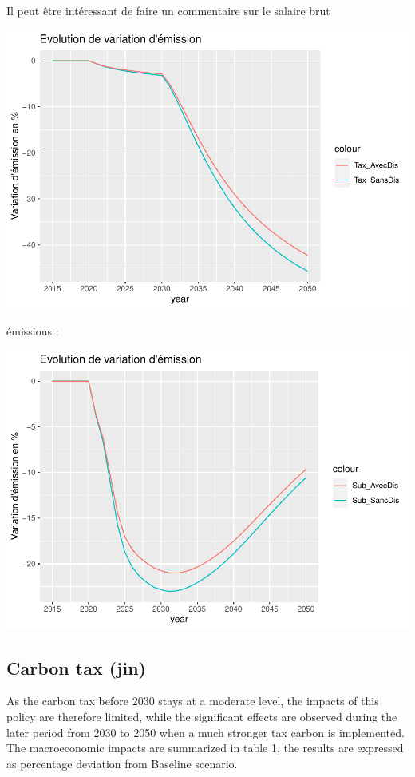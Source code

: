 \documentclass[
]{article}
\begin{document}
Il peut être intéressant de faire un commentaire sur le salaire brut

\includegraphics{Modele-ThreeMe-Tunisie_Sequeira_Valilou_Wang_files/figure-latex/unnamed-chunk-13-1.pdf}

émissions :

\includegraphics{Modele-ThreeMe-Tunisie_Sequeira_Valilou_Wang_files/figure-latex/unnamed-chunk-14-1.pdf}

\hypertarget{carbon-tax-jin-1}{%
\subsection{Carbon tax (jin)}\label{carbon-tax-jin-1}}

As the carbon tax before 2030 stays at a moderate level, the impacts of
this policy are therefore limited, while the significant effects are
observed during the later period from 2030 to 2050 when a much stronger
tax carbon is implemented. The macroeconomic impacts are summarized in
table 1, the results are expressed as percentage deviation from Baseline
scenario.
\end{document}
